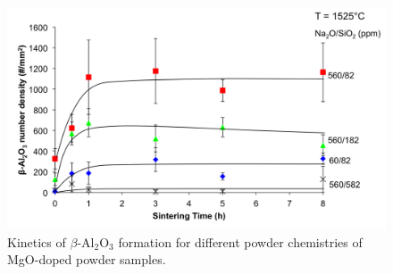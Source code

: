 \newpage
\begin{figure}[H]
	\centering
	\includegraphics[width=\textwidth]{Chapter-5/Figures/Figure4.png}
	\caption{Kinetics of $\beta$-Al$_{2}$O$_{3}$ formation for different powder chemistries of MgO-doped powder samples.}
	\label{Ch5-figure:Figure4}
\end{figure}

